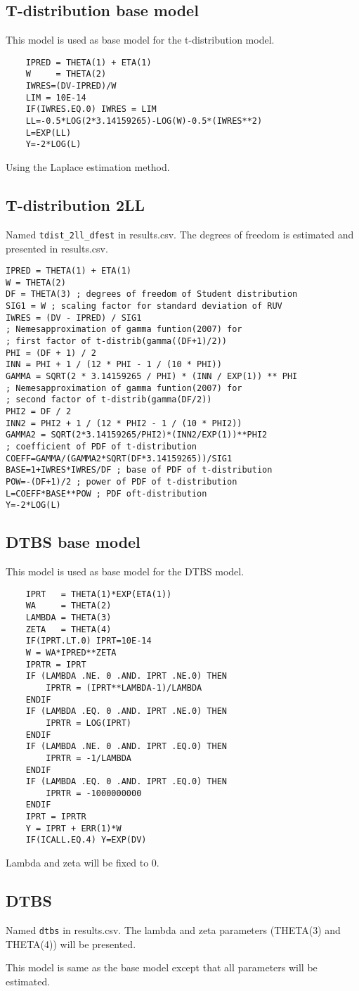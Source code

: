 \subsection{T-distribution base model}
This model is used as base model for the t-distribution model.

\begin{verbatim}
    IPRED = THETA(1) + ETA(1)
	W     = THETA(2)
	IWRES=(DV-IPRED)/W
	LIM = 10E-14
	IF(IWRES.EQ.0) IWRES = LIM
	LL=-0.5*LOG(2*3.14159265)-LOG(W)-0.5*(IWRES**2)
	L=EXP(LL)
	Y=-2*LOG(L)
\end{verbatim}

Using the Laplace estimation method.

\subsection{T-distribution 2LL}
Named \verb|tdist_2ll_dfest| in results.csv. The degrees of freedom is estimated and presented in results.csv.

\begin{verbatim}
IPRED = THETA(1) + ETA(1)
W = THETA(2)
DF = THETA(3) ; degrees of freedom of Student distribution
SIG1 = W ; scaling factor for standard deviation of RUV
IWRES = (DV - IPRED) / SIG1
; Nemesapproximation of gamma funtion(2007) for
; first factor of t-distrib(gamma((DF+1)/2))
PHI = (DF + 1) / 2
INN = PHI + 1 / (12 * PHI - 1 / (10 * PHI))
GAMMA = SQRT(2 * 3.14159265 / PHI) * (INN / EXP(1)) ** PHI
; Nemesapproximation of gamma funtion(2007) for
; second factor of t-distrib(gamma(DF/2))
PHI2 = DF / 2
INN2 = PHI2 + 1 / (12 * PHI2 - 1 / (10 * PHI2))
GAMMA2 = SQRT(2*3.14159265/PHI2)*(INN2/EXP(1))**PHI2
; coefficient of PDF of t-distribution
COEFF=GAMMA/(GAMMA2*SQRT(DF*3.14159265))/SIG1
BASE=1+IWRES*IWRES/DF ; base of PDF of t-distribution
POW=-(DF+1)/2 ; power of PDF of t-distribution
L=COEFF*BASE**POW ; PDF oft-distribution
Y=-2*LOG(L)
\end{verbatim}

\subsection{DTBS base model}
This model is used as base model for the DTBS model.
\begin{verbatim}
    IPRT   = THETA(1)*EXP(ETA(1))
	WA     = THETA(2)
	LAMBDA = THETA(3)
	ZETA   = THETA(4)
	IF(IPRT.LT.0) IPRT=10E-14
	W = WA*IPRED**ZETA
	IPRTR = IPRT
	IF (LAMBDA .NE. 0 .AND. IPRT .NE.0) THEN
		IPRTR = (IPRT**LAMBDA-1)/LAMBDA
	ENDIF
	IF (LAMBDA .EQ. 0 .AND. IPRT .NE.0) THEN
		IPRTR = LOG(IPRT)
	ENDIF
	IF (LAMBDA .NE. 0 .AND. IPRT .EQ.0) THEN
		IPRTR = -1/LAMBDA
	ENDIF
	IF (LAMBDA .EQ. 0 .AND. IPRT .EQ.0) THEN
		IPRTR = -1000000000
	ENDIF
	IPRT = IPRTR
	Y = IPRT + ERR(1)*W
	IF(ICALL.EQ.4) Y=EXP(DV)
\end{verbatim}

Lambda and zeta will be fixed to 0.

\subsection{DTBS}
Named \verb|dtbs| in results.csv. The lambda and zeta parameters (THETA(3) and THETA(4)) will be presented.

This model is same as the base model except that all parameters will be estimated.


